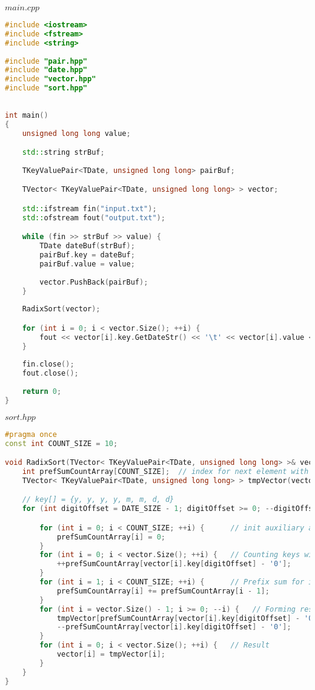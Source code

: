 $main.cpp$
\begin{lstlisting}[language=c++]
#include <iostream>
#include <fstream>
#include <string>
	
#include "pair.hpp"
#include "date.hpp"
#include "vector.hpp"
#include "sort.hpp"
	
	
int main()
{
	unsigned long long value;

	std::string strBuf;
	
	TKeyValuePair<TDate, unsigned long long> pairBuf;    

	TVector< TKeyValuePair<TDate, unsigned long long> > vector;

	std::ifstream fin("input.txt");
	std::ofstream fout("output.txt");

	while (fin >> strBuf >> value) {
		TDate dateBuf(strBuf);
		pairBuf.key = dateBuf;
		pairBuf.value = value;
		
		vector.PushBack(pairBuf);
	}
	
	RadixSort(vector);

	for (int i = 0; i < vector.Size(); ++i) {
		fout << vector[i].key.GetDateStr() << '\t' << vector[i].value << '\n';
	}
	
	fin.close();
	fout.close();
	
	return 0;
}
\end{lstlisting}

$sort.hpp$
\begin{lstlisting}[language=c++]
#pragma once
const int COUNT_SIZE = 10;

void RadixSort(TVector< TKeyValuePair<TDate, unsigned long long> >& vector) {
	int prefSumCountArray[COUNT_SIZE];  // index for next element with this digit at the place
	TVector< TKeyValuePair<TDate, unsigned long long> > tmpVector(vector.Size());

	// key[] = {y, y, y, y, m, m, d, d}
	for (int digitOffset = DATE_SIZE - 1; digitOffset >= 0; --digitOffset) {

		for (int i = 0; i < COUNT_SIZE; ++i) {      // init auxiliary arrays with zeros
			prefSumCountArray[i] = 0;
		}
		for (int i = 0; i < vector.Size(); ++i) {   // Counting keys with same digit
			++prefSumCountArray[vector[i].key[digitOffset] - '0'];
		}
		for (int i = 1; i < COUNT_SIZE; ++i) {      // Prefix sum for index of beginning of a series of same keys
			prefSumCountArray[i] += prefSumCountArray[i - 1];
		}
		for (int i = vector.Size() - 1; i >= 0; --i) {   // Forming result
			tmpVector[prefSumCountArray[vector[i].key[digitOffset] - '0'] - 1] = vector[i];
			--prefSumCountArray[vector[i].key[digitOffset] - '0'];
		}
		for (int i = 0; i < vector.Size(); ++i) {   // Result
			vector[i] = tmpVector[i];
		}
	}
}
\end{lstlisting}

